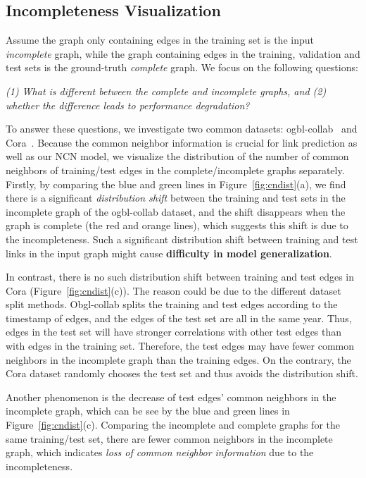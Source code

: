 \documentclass{article}
\theoremstyle{plain}
\theoremstyle{definition}
\theoremstyle{remark}
\begin{document}
\subsection{Incompleteness Visualization}
\label{sec:incompletenessvis}
Assume the graph only containing edges in the training set is the input \textit{incomplete} graph, while the graph containing edges in the training, validation and test sets is the ground-truth \textit{complete} graph. We focus on the following questions:
\begin{center}
    \textit{(1) What is different between the complete and incomplete graphs, and (2) whether the difference leads to performance degradation?}
\end{center}
To answer these questions, we investigate two common datasets: ogbl-collab~\citep{OGB} and Cora~\citep{Cora}. Because the common neighbor information is crucial for link prediction as well as our NCN model, we visualize the distribution of the number of common neighbors of training/test edges in the complete/incomplete graphs separately. Firstly, by comparing the blue and green lines in Figure~\ref{fig:cndist}(a), we find there is a significant \textit{distribution shift} between the training and test sets in the incomplete graph of the ogbl-collab dataset, and the shift disappears when the graph is complete (the red and orange lines), which suggests this shift is due to the incompleteness. Such a significant distribution shift between training and test links in the input graph might cause \textbf{difficulty in model generalization}.

In contrast, there is no such distribution shift between training and test edges in Cora (Figure~\ref{fig:cndist}(c)). The reason could be due to the different dataset split methods. Obgl-collab splits the training and test edges according to the timestamp of edges, and the edges of the test set are all in the same year. Thus, edges in the test set will have stronger correlations with other test edges than with edges in the training set. Therefore, the test edges may have fewer common neighbors in the incomplete graph than the training edges. On the contrary, the Cora dataset randomly chooses the test set and thus avoids the distribution shift. 

Another phenomenon is the decrease of test edges' common neighbors in the incomplete graph, which can be see by the blue and green lines in Figure~\ref{fig:cndist}(c). Comparing the incomplete and complete graphs for the same training/test set, there are fewer common neighbors in the incomplete graph, which indicates \textit{loss of common neighbor information} due to the incompleteness. 
\end{document}
